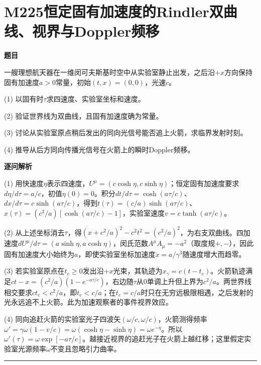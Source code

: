 \documentclass[UTF8,a4paper,11pt,oneside,openany]{ctexbook}
\begin{document}
\section*{M225\quad 恒定固有加速度的Rindler双曲线、视界与Doppler频移}
\textbf{题目}\par
一艘理想航天器在一维闵可夫斯基时空中从实验室静止出发，之后沿$+x$方向保持固有加速度$a>0$常量，初始$(t,x)=(0,0)$，光速$c$。
\par\smallskip\noindent (1) 以固有时$\tau$求四速度、实验室坐标和速度。
\par\smallskip\noindent (2) 验证世界线为双曲线，且固有加速度确为常量。
\par\smallskip\noindent (3) 讨论从实验室原点稍后发出的同向光信号能否追上火箭，求临界发射时刻。
\par\smallskip\noindent (4) 推导从后方同向传播光信号在火箭上的瞬时Doppler频移。
\par\medskip\textbf{逐问解析}\par
\par\smallskip\noindent (1) 用快速度$\eta$表示四速度，$U^\mu=(c\cosh\eta,c\sinh\eta)$；恒定固有加速度要求$d\eta/d\tau=a/c$，初值$\eta(0)=0$。积分$dt/d\tau=\cosh(a\tau/c)$、$dx/d\tau=c\sinh(a\tau/c)$，得到$t(\tau)=(c/a)\sinh(a\tau/c)$、$x(\tau)=(c^2/a)[\cosh(a\tau/c)-1]$，实验室速度$v=c\tanh(a\tau/c)$。
\par\smallskip\noindent (2) 从上述坐标消去$\tau$，得$(x+c^2/a)^2-c^2t^2=(c^2/a)^2$，为右支双曲线。四加速度$dU^\mu/d\tau=(a\sinh\eta,a\cosh\eta)$，闵氏范数$A^\mu A_\mu=-a^2$（取度规$+,-$），因此固有加速度大小始终为$a$，即使实验室坐标加速度$\ddot x=a/\gamma^3$随速度增大而趋零。
\par\smallskip\noindent (3) 若实验室原点在$t_e\ge0$发出沿$+x$光束，其轨迹为$x_{\gamma}=c(t-t_e)$。火箭轨迹满足$ct-x=(c^2/a)(1-e^{-a\tau/c})$，右边随$\tau$从0单调上升但上界为$c^2/a$。两世界线相交要求$ct_e<c^2/a$，即$t_e<c/a$；在$t_e=c/a$时只在无穷远极限相遇，之后发射的光永远追不上火箭。此为加速观察者的事件视界效应。
\par\smallskip\noindent (4) 同向追赶火箭的实验室光子四波矢$(\omega/c,\omega/c)$，火箭测得频率$\omega'=\gamma\omega(1-v/c)=\omega(\cosh\eta-\sinh\eta)=\omega e^{-\eta}$。所以$\omega'(\tau)=\omega\exp[-a\tau/c]$。越接近视界的追赶光子在火箭上越红移；这里假定实验室光源频率$\omega$不变且忽略引力曲率。
\par\medskip\hrule\medskip
\end{document}
